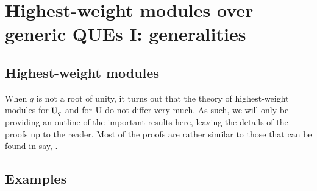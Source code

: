 \section{Highest-weight modules over generic QUEs I: generalities}
    \subsection{Highest-weight modules}
        When $q$ is not a root of unity, it turns out that the theory of highest-weight modules for $\mathrm{U}_q$ and for $\mathrm{U}$ do not differ very much. As such, we will only be providing an outline of the important results here, leaving the details of the proofs up to the reader. Most of the proofs are rather similar to those that can be found in say, \cite[Chapterr VI]{humphreys_lie_algebras}.

    \subsection{Examples}